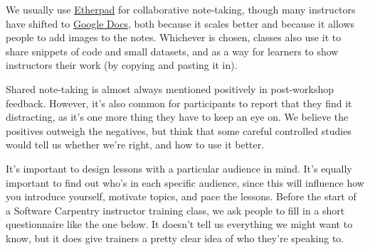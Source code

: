 We usually use \href{http://etherpad.org}{Etherpad} for collaborative
note-taking, though many instructors have shifted to
\href{https://docs.google.com}{Google Docs}, both because it scales
better and because it allows people to add images to the notes.
Whichever is chosen, classes also use it to share snippets of code and
small datasets, and as a way for learners to show instructors their
work (by copying and pasting it in).

Shared note-taking is almost always mentioned positively in
post-workshop feedback.  However, it's also common for participants to
report that they find it distracting, as it's one more thing they have
to keep an eye on.  We believe the positives outweigh the negatives,
but think that some careful controlled studies would tell us whether
we're right, and how to use it better.


It's important to design lessons with a particular audience in mind.
It's equally important to find out who's in each specific audience,
since this will influence how you introduce yourself, motivate topics,
and pace the lessons.  Before the start of a Software Carpentry
instructor training class, we ask people to fill in a short
questionnaire like the one below.  It doesn't tell us everything we
might want to know, but it does give trainers a pretty clear idea of
who they're speaking to.

